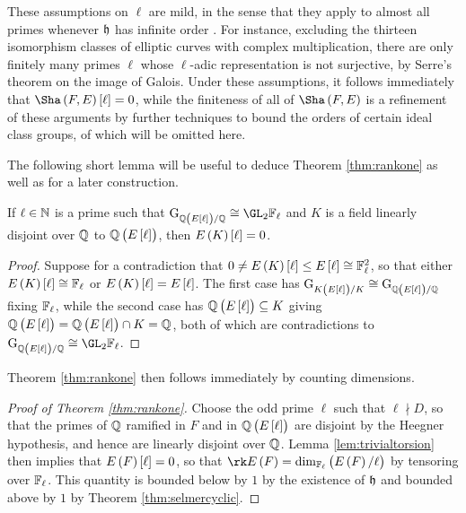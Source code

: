 These assumptions on $ \ell $ are mild, in the sense that they apply to almost all primes whenever $ \mathfrak{h} $ has infinite order \cite[Section 2]{Gro91}. For instance, excluding the thirteen isomorphism classes of elliptic curves with complex multiplication, there are only finitely many primes $ \ell $ whose $ \ell $-adic representation is not surjective, by Serre's theorem on the image of Galois. Under these assumptions, it follows immediately that $ \Sha\br{F, E}\sbr{\ell} = 0 $, while the finiteness of all of $ \Sha\br{F, E} $ is a refinement of these arguments by further techniques to bound the orders of certain ideal class groups, of which will be omitted here.

The following short lemma will be useful to deduce Theorem \ref{thm:rankone} as well as for a later construction.

\begin{lemma}
\label{lem:trivialtorsion}
If $ \ell \in \mathbb{N} $ is a prime such that $ \G_{\QQ\br{E\sbr{\ell}} / \QQ} \cong \GL_2 \FF_\ell $ and $ K $ is a field linearly disjoint over $ \mathbb{Q} $ to $ \QQ\br{E\sbr{\ell}} $, then $ E\br{K}\sbr{\ell} = 0 $.
\end{lemma}

\begin{proof}
Suppose for a contradiction that $ 0 \ne E\br{K}\sbr{\ell} \le E\sbr{\ell} \cong \FF_\ell^2 $, so that either $ E\br{K}\sbr{\ell} \cong \FF_\ell $ or $ E\br{K}\sbr{\ell} = E\sbr{\ell} $. The first case has $ \G_{K\br{E\sbr{\ell}} / K} \cong \G_{\QQ\br{E\sbr{\ell}} / \QQ} $ fixing $ \mathbb{F}_\ell $, while the second case has $ \QQ\br{E\sbr{\ell}} \subseteq K $ giving $ \QQ\br{E\sbr{\ell}} = \QQ\br{E\sbr{\ell}} \cap K = \QQ $, both of which are contradictions to $ \G_{\QQ\br{E\sbr{\ell}} / \QQ} \cong \GL_2 \FF_\ell $.
\end{proof}

Theorem \ref{thm:rankone} then follows immediately by counting dimensions.

\begin{proof}[Proof of Theorem \ref{thm:rankone}]
Choose the odd prime $ \ell $ such that $ \ell \nmid D $, so that the primes of $ \mathbb{Q} $ ramified in $ F $ and in $ \QQ\br{E\sbr{\ell}} $ are disjoint by the Heegner hypothesis, and hence are linearly disjoint over $ \mathbb{Q} $. Lemma \ref{lem:trivialtorsion} then implies that $ E\br{F}\sbr{\ell} = 0 $, so that $ \rk E\br{F} = \dim_{\FF_\ell} \br{E\br{F} / \ell} $ by tensoring over $ \mathbb{F}_\ell $. This quantity is bounded below by $ 1 $ by the existence of $ \mathfrak{h} $ and bounded above by $ 1 $ by Theorem \ref{thm:selmercyclic}.
\end{proof}

